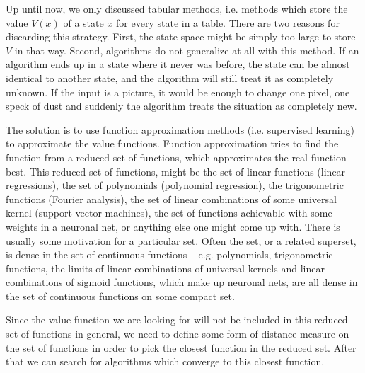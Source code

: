 Up until now, we only discussed tabular methods, i.e. methods which store the value \(V(x)\) of a state \(x\) for every state in a table. There are two reasons for discarding this strategy. First, the state space might be simply too large to store \(V\) in that way. Second, algorithms do not generalize at all with this method. If an algorithm ends up in a state where it never was before, the state can be almost identical to another state, and the algorithm will still treat it as completely unknown. If the input is a picture, it would be enough to change one pixel, one speck of dust and suddenly the algorithm treats the situation as completely new.

The solution is to use function approximation methods (i.e. supervised learning) to approximate the value functions. Function approximation tries to find the function from a reduced set of functions, which approximates the real function best. This reduced set of functions, might be the set of linear functions (linear regressions), the set of polynomials (polynomial regression), the trigonometric functions (Fourier analysis), the set of linear combinations of some universal kernel (support vector machines), the set of functions achievable with some weights in a neuronal net, or anything else one might come up with. There is usually some motivation for a particular set. Often the set, or a related superset, is dense in the set of continuous functions -- e.g. polynomials, trigonometric functions, the limits of linear combinations of universal kernels and linear combinations of sigmoid functions, which make up neuronal nets, are all dense in the set of continuous functions on some compact set.

Since the value function we are looking for will not be included in this reduced set of functions in general, we need to define some form of distance measure on the set of functions in order to pick the closest function in the reduced set. After that we can search for algorithms which converge to this closest function.

